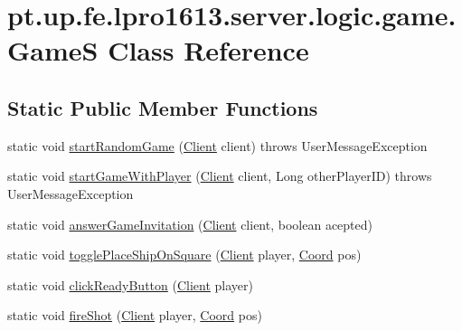 \hypertarget{classpt_1_1up_1_1fe_1_1lpro1613_1_1server_1_1logic_1_1game_1_1_game_s}{}\section{pt.\+up.\+fe.\+lpro1613.\+server.\+logic.\+game.\+GameS Class Reference}
\label{classpt_1_1up_1_1fe_1_1lpro1613_1_1server_1_1logic_1_1game_1_1_game_s}
\subsection*{Static Public Member Functions}
\begin{DoxyCompactItemize}
\item 
static void \hyperlink{classpt_1_1up_1_1fe_1_1lpro1613_1_1server_1_1logic_1_1game_1_1_game_s_ad185482b31f44a23e868605f9cc49d09}{start\+Random\+Game} (\hyperlink{classpt_1_1up_1_1fe_1_1lpro1613_1_1server_1_1conn_1_1_client}{Client} client)  throws User\+Message\+Exception 
\item 
static void \hyperlink{classpt_1_1up_1_1fe_1_1lpro1613_1_1server_1_1logic_1_1game_1_1_game_s_ae8d6ec6320a1f06d60719c91dbfbe21c}{start\+Game\+With\+Player} (\hyperlink{classpt_1_1up_1_1fe_1_1lpro1613_1_1server_1_1conn_1_1_client}{Client} client, Long other\+Player\+ID)  throws User\+Message\+Exception 
\item 
static void \hyperlink{classpt_1_1up_1_1fe_1_1lpro1613_1_1server_1_1logic_1_1game_1_1_game_s_af7085705cb3cb78df5d0187c08a761b2}{answer\+Game\+Invitation} (\hyperlink{classpt_1_1up_1_1fe_1_1lpro1613_1_1server_1_1conn_1_1_client}{Client} client, boolean acepted)
\item 
static void \hyperlink{classpt_1_1up_1_1fe_1_1lpro1613_1_1server_1_1logic_1_1game_1_1_game_s_af95663046473b1a2aceebf4fd27906a2}{toggle\+Place\+Ship\+On\+Square} (\hyperlink{classpt_1_1up_1_1fe_1_1lpro1613_1_1server_1_1conn_1_1_client}{Client} player, \hyperlink{classpt_1_1up_1_1fe_1_1lpro1613_1_1sharedlib_1_1utils_1_1_coord}{Coord} pos)
\item 
static void \hyperlink{classpt_1_1up_1_1fe_1_1lpro1613_1_1server_1_1logic_1_1game_1_1_game_s_a86e47ee40e26d36abfdac5847e423a35}{click\+Ready\+Button} (\hyperlink{classpt_1_1up_1_1fe_1_1lpro1613_1_1server_1_1conn_1_1_client}{Client} player)
\item 
static void \hyperlink{classpt_1_1up_1_1fe_1_1lpro1613_1_1server_1_1logic_1_1game_1_1_game_s_a13d63cfefe7a487a5c6e694bbeba57e6}{fire\+Shot} (\hyperlink{classpt_1_1up_1_1fe_1_1lpro1613_1_1server_1_1conn_1_1_client}{Client} player, \hyperlink{classpt_1_1up_1_1fe_1_1lpro1613_1_1sharedlib_1_1utils_1_1_coord}{Coord} pos)

\end{DoxyCompactItemize}
